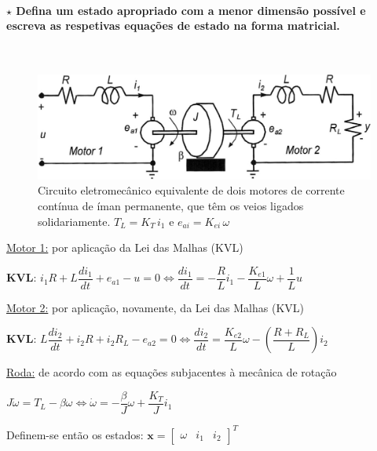 \paragraph[3.2.2.3 Problema 3]{$\pmb{\star}$ Defina um estado apropriado com a menor dimensão possível e escreva as respetivas equações de estado na forma matricial. }\mbox{}\\
\begin{figure}[H]
    \centering
    \includegraphics[width = 0.6\linewidth]{img/mechanics/motor-cc-exame2021.png}
    \caption{Circuito eletromecânico equivalente de dois motores de corrente contínua de íman permanente, que têm os veios ligados solidariamente. $T_L = K_T\, i_1$ e $e_{ai} = K_{ei}\, \omega$}
    \label{fig:motor-cc-exame20/21}
\end{figure}

\noindent \underline{Motor 1:} por aplicação da Lei das Malhas (KVL)

\noindent \hspace*{1.5 em}\raisebox{0.2 em}{$\drsh$} \textbf{KVL}: $i_1 R + L \dfrac{d i_1}{dt} + e_{a1} - u = 0 \iff \dfrac{d i_1}{dt} = - \dfrac{R}{L} i_1 - \dfrac{K_{e1}}{L} \omega + \dfrac{1}{L}u$

\vspace{0.5em}
\noindent \underline{Motor 2:} por aplicação, novamente, da Lei das Malhas (KVL)

\noindent \hspace*{1.5 em}\raisebox{0.2 em}{$\drsh$} \textbf{KVL}: $L \dfrac{d i_2}{dt} + i_2 R + i_2 R_L - e_{a2} = 0 \iff \dfrac{d i_2}{dt} = \dfrac{K_{e2}}{L}\omega - \left(\dfrac{R+R_L}{L}\right) i_2$

\vspace{0.5em}
\noindent \underline{Roda:} de acordo com as equações subjacentes à mecânica de rotação

\noindent \hspace*{1.5 em}\raisebox{0.2 em}{$\drsh$} $J \dot{\omega} = T_L - \beta \omega \iff \dot{\omega} = -\dfrac{\beta}{J}\omega + \dfrac{K_T}{J} i_1$

\vspace{0.5em}
\noindent Definem-se então os estados: $\pmb{x} = \begin{bmatrix} \omega & i_1 & i_2 \end{bmatrix}^T$


